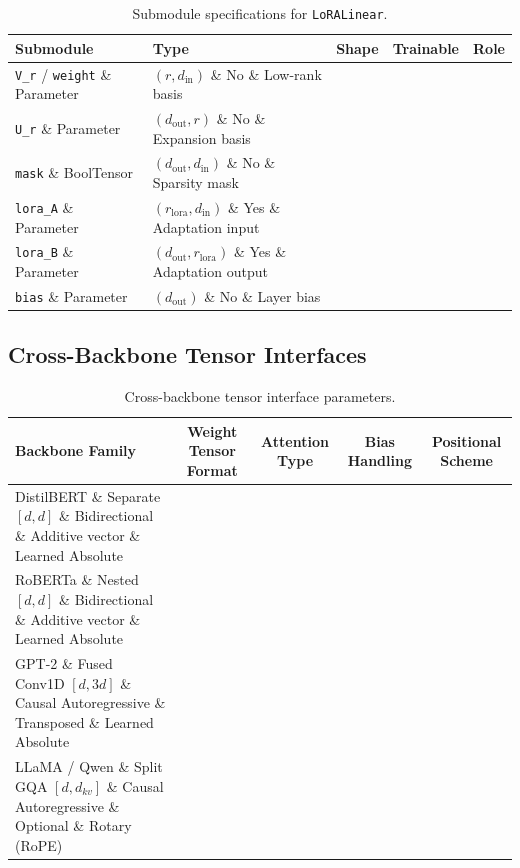 \begin{table}[H]
\centering
\small
\begin{tabularx}{\linewidth}{llccX}
\toprule
\textbf{Submodule} & \textbf{Type} & \textbf{Shape} & \textbf{Trainable} & \textbf{Role} \\
\midrule
\texttt{V\_r} / \texttt{weight} \& Parameter & $(r, d_{\text{in}})$ \& No \& Low-rank basis \\
\texttt{U\_r} \& Parameter & $(d_{\text{out}}, r)$ \& No \& Expansion basis \\
\texttt{mask} \& BoolTensor & $(d_{\text{out}}, d_{\text{in}})$ \& No \& Sparsity mask \\
\texttt{lora\_A} \& Parameter & $(r_{\text{lora}}, d_{\text{in}})$ \& Yes \& Adaptation input \\
\texttt{lora\_B} \& Parameter & $(d_{\text{out}}, r_{\text{lora}})$ \& Yes \& Adaptation output \\
\texttt{bias} \& Parameter & $(d_{\text{out}})$ \& No \& Layer bias \\
\bottomrule
\end{tabularx}
\caption{Submodule specifications for \texttt{LoRALinear}.}
\label{tab:submodules_decay\_linear\_attention}
\end{table}

\subsection{Cross-Backbone Tensor Interfaces}
\begin{table}[H]
\centering
\small
\begin{tabularx}{\linewidth}{lcccc}
\toprule
\textbf{Backbone Family} & \textbf{Weight Tensor Format} & \textbf{Attention Type} & \textbf{Bias Handling} & \textbf{Positional Scheme} \\
\midrule
DistilBERT \& Separate $[d, d]$ \& Bidirectional \& Additive vector \& Learned Absolute \\
RoBERTa \& Nested $[d, d]$ \& Bidirectional \& Additive vector \& Learned Absolute \\
GPT-2 \& Fused Conv1D $[d, 3d]$ \& Causal Autoregressive \& Transposed \& Learned Absolute \\
LLaMA / Qwen \& Split GQA $[d, d_{kv}]$ \& Causal Autoregressive \& Optional \& Rotary (RoPE) \\
\bottomrule
\end{tabularx}
\caption{Cross-backbone tensor interface parameters.}
\label{tab:backbone_interfaces}
\end{table}

